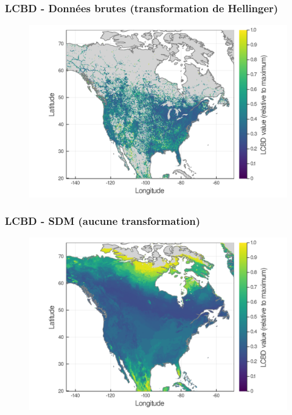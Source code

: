 \documentclass[10pt]{beamer}
\begin{document}
\begin{frame}
  \frametitle{LCBD - Données brutes (transformation de Hellinger)}
  \begin{figure}
    \centering
    \hspace*{-0cm}\includegraphics[scale=0.17]{fig/05_raw_lcbd-transf.png}
  \end{figure}
\end{frame}

\begin{frame}
  \frametitle{LCBD - SDM (aucune transformation)}
  \begin{figure}
    \centering
    \hspace*{-0cm}\includegraphics[scale=0.17]{fig/05_sdm_lcbd.png}
  \end{figure}
\end{frame}
\end{document}
